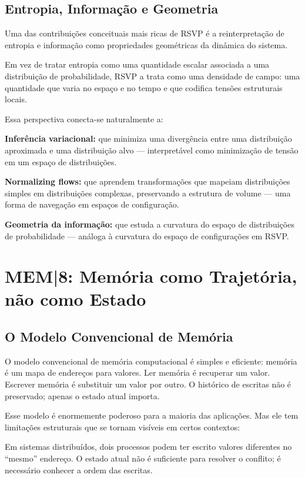 \documentclass[11pt, a4paper]{article}
\theoremstyle{named}
\begin{document}
\subsection{Entropia, Informação e Geometria}

Uma das contribuições conceituais mais ricas de RSVP é a
reinterpretação de entropia e informação como propriedades geométricas
da dinâmica do sistema.

Em vez de tratar entropia como uma quantidade escalar associada a uma
distribuição de probabilidade, RSVP a trata como uma densidade de campo:
uma quantidade que varia no espaço e no tempo e que codifica tensões
estruturais locais.

Essa perspectiva conecta-se naturalmente a:

\textbf{Inferência variacional:} que minimiza uma divergência entre uma
distribuição aproximada e uma distribuição alvo — interpretável como
minimização de tensão em um espaço de distribuições.

\textbf{Normalizing flows:} que aprendem transformações que mapeiam
distribuições simples em distribuições complexas, preservando a estrutura
de volume — uma forma de navegação em espaços de configuração.

\textbf{Geometria da informação:} que estuda a curvatura do espaço de
distribuições de probabilidade — análoga à curvatura do espaço de
configurações em RSVP.

\section{MEM|8: Memória como Trajetória, não como Estado}

\subsection{O Modelo Convencional de Memória}

O modelo convencional de memória computacional é simples e eficiente:
memória é um mapa de endereços para valores. Ler memória é recuperar
um valor. Escrever memória é substituir um valor por outro. O histórico
de escritas não é preservado; apenas o estado atual importa.

Esse modelo é enormemente poderoso para a maioria das aplicações.
Mas ele tem limitações estruturais que se tornam visíveis em certos
contextos:

Em sistemas distribuídos, dois processos podem ter escrito valores
diferentes no ``mesmo'' endereço. O estado atual não é suficiente para
resolver o conflito; é necessário conhecer a ordem das escritas.
\end{document}
